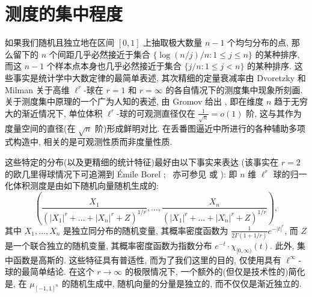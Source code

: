 \section{测度的集中程度}\label{sec:4}

如果我们随机且独立地在区间 $[0,1]$ 上抽取极大数量 $n-1$ 个均匀分布的点, 那么留下的 $n$ 个间距几乎必然接近于集合 $\{\log(n/j)/n : 1\le j\le n\}$ 的某种排序, 而这 $n-1$ 个样本点本身也几乎必然接近于集合 $\{j/n : 1\le j< n\}$ 的某种排序.
这些事实是统计学中大数定律的最简单表述, 其次精细的定量衰减率由 Dvoretzky 和 Milman \cite{MS86}\cite{Mil92}\cite{Led01} 关于高维 $\ell^r$-球在 $r=1$ 和 $r=\infty$ 的各自情况下的测度集中现象所刻画.
关于测度集中原理的一个广为人知的表述, 由 Gromov 给出 \cite[§ $3\frac{1}{2}.20$]{Gro07}, 即在维度 $n$ 趋于无穷大的渐近情况下, 单位体积 $\ell^r$-球的可观测直径仅在 $\frac{1}{\sqrt{n}}=o(1)$ 阶, 这与其作为度量空间的直径(在 $\sqrt{n}$ 阶)形成鲜明对比.
在丢番图逼近中所进行的各种辅助多项式构造中, 相关的是可观测性质而非度量性质.

这些特定的分布(以及更精细的统计特征)最好由以下事实来表达 \cite[Theorem 1]{BGMN05} (该事实在 $r=2$ 的欧几里得球情况下可追溯到 \'Emile Borel \cite[§ V]{Bor1914}\footnotemark[18];\  亦可参见 \cite[Lemma 1]{SZ90} 或 \cite[§ 3]{RR91}): 即 $n$ 维 $\ell^r$ 球的归一化体积测度是由如下随机向量随机生成的:
\[ \left(\frac{X_1}{(|X_1|^r + \dots + |X_n|^r + Z)^{1/r}}, \dots, \frac{X_n}{(|X_1|^r + \dots + |X_n|^r + Z)^{1/r}}\right), \]
其中 $X_1, \ldots, X_n$ 是独立同分布的随机变量, 其概率密度函数为 $\frac{1}{2\Gamma(1+1/r)}e^{-|t|^r}$, 而 $Z$ 是一个联合独立的随机变量, 其概率密度函数为指数分布 $e^{-t} \cdot \chi_{[0,\infty)}(t)$.
此外, 集中函数是高斯的.
这些特征具有普适性, 而为了我们这里的目的, 仅使用具有 $\ell^{\infty}$-球的最简单结论.
在这个 $r \to \infty$ 的极限情况下, 一个额外的(但仅是技术性的)简化是, 在 $\mu_{[-1,1]^n}$ 的随机生成中, 随机向量的分量是独立的, 而不仅仅是渐近独立的.

